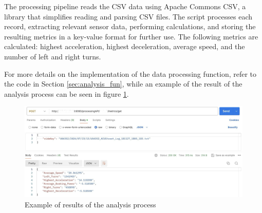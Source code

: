 The processing pipeline reads the CSV data using Apache Commons CSV, a library that simplifies reading and parsing CSV files. The script processes each record, extracting relevant sensor data, performing calculations, and storing the resulting metrics in a key-value format for further use. The following metrics are calculated: highest acceleration, highest deceleration, average speed, and the number of left and right turns.

For more details on the implementation of the data processing function, refer to the code in Section \ref{sec:analysis_fun}, while an example of the result of the analysis process can be seen in figure \ref{fig:analysis}.
\begin{figure}[htbp]
    \centering
    \includegraphics[width=1\textwidth]{Immagini/get_metrics.png}
    \caption{Example of results of the analysis process}
    \label{fig:analysis}
\end{figure}
